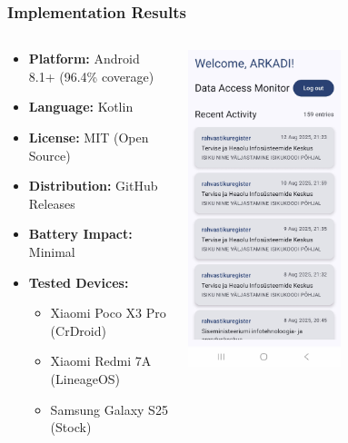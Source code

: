 \documentclass[aspectratio=169,11pt]{beamer}
\begin{document}
\begin{frame}
\frametitle{Implementation Results}
\begin{columns}
\begin{column}{0.6\textwidth}
\begin{itemize}
    \item \textbf{Platform:} Android 8.1+ (96.4\% coverage)
    \item \textbf{Language:} Kotlin
    \item \textbf{License:} MIT (Open Source)
    \item \textbf{Distribution:} GitHub Releases
    \item \textbf{Battery Impact:} Minimal
    \item \textbf{Tested Devices:}
    \begin{itemize}
        \item Xiaomi Poco X3 Pro (CrDroid)
        \item Xiaomi Redmi 7A (LineageOS)  
        \item Samsung Galaxy S25 (Stock)
    \end{itemize}
\end{itemize}
\end{column}
\begin{column}{0.4\textwidth}

\begin{center}

\includegraphics[width=0.55\textwidth]{../english/figures/Screenshot_20250812_212336_Data Access Notifier.jpg}
\end{center}
\end{column}
\end{columns}
\end{frame}
\end{document}
